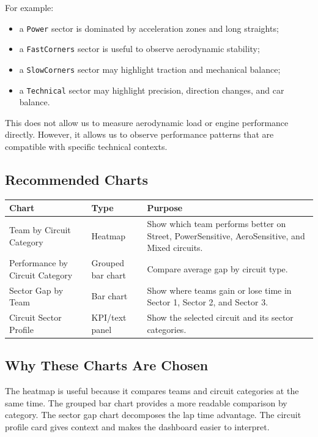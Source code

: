 \documentclass[12pt,a4paper]{article}
\begin{document}
	For example:
	
	\begin{itemize}[leftmargin=1.2cm]
		\item a \texttt{Power} sector is dominated by acceleration zones and long straights;
		\item a \texttt{FastCorners} sector is useful to observe aerodynamic stability;
		\item a \texttt{SlowCorners} sector may highlight traction and mechanical balance;
		\item a \texttt{Technical} sector may highlight precision, direction changes, and car balance.
	\end{itemize}
	
	This does not allow us to measure aerodynamic load or engine performance directly.
	However, it allows us to observe performance patterns that are compatible with specific technical contexts.
	
	\subsection{Recommended Charts}
	
	\begin{longtable}{p{4cm} p{4cm} p{6cm}}
		\toprule
		\textbf{Chart} & \textbf{Type} & \textbf{Purpose} \\
		\midrule
		Team by Circuit Category & Heatmap & Show which team performs better on Street, PowerSensitive, AeroSensitive, and Mixed circuits. \\
		Performance by Circuit Category & Grouped bar chart & Compare average gap by circuit type. \\
		Sector Gap by Team & Bar chart & Show where teams gain or lose time in Sector 1, Sector 2, and Sector 3. \\
		Circuit Sector Profile & KPI/text panel & Show the selected circuit and its sector categories. \\
		\bottomrule
	\end{longtable}
	
	\subsection{Why These Charts Are Chosen}
	
	The heatmap is useful because it compares teams and circuit categories at the same time.
	The grouped bar chart provides a more readable comparison by category.
	The sector gap chart decomposes the lap time advantage.
	The circuit profile card gives context and makes the dashboard easier to interpret.
	
\end{document}
